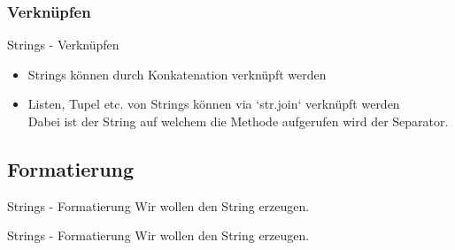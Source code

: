 \subsubsection{Verknüpfen}
\begin{frame}[fragile]{Strings - Verknüpfen}
	\begin{itemize}
	    \item Strings können durch Konkatenation verknüpft werden \\
	    
	    \item Listen, Tupel etc. von Strings können via `str.join` verknüpft werden \\
	    
	    Dabei ist der String auf welchem die Methode aufgerufen wird der Separator.
	\end{itemize}
\end{frame}


\subsection{Formatierung}
\begin{frame}[fragile]{Strings - Formatierung}
	Wir wollen den String  erzeugen.

	
\end{frame}

\begin{frame}[fragile]{Strings - Formatierung}
	Wir wollen den String  erzeugen.
	
\end{frame}




